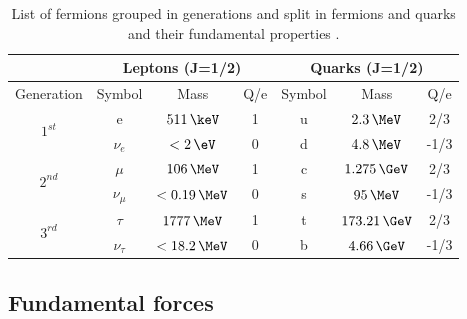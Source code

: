 \begin{table}[!htb]
\centering
\begin{tabular}{|c||c|c|c||c|c|c|}
\hline
 & \multicolumn{3}{c||}{Leptons (J=1/2)} & \multicolumn{3}{c|}{Quarks (J=1/2)} \\
\hline
Generation                &     Symbol &            Mass & Q/e & Symbol &           Mass & Q/e \\
\hline\hline
\multirow{2}{*}{$1^{st}$} & e          &     $511\,\keV$ &   1 &      u &    $2.3\,\MeV$ &  2/3 \\
                          & $\nu_e$    &     $< 2\, \eV$ &   0 &      d &    $4.8\,\MeV$ & -1/3 \\
\hline
\hline
\multirow{2}{*}{$2^{nd}$} & $\mu$      &  $   106\,\MeV$ &   1 &      c &  $1.275\,\GeV$ &  2/3 \\
                          & $\nu_\mu$  &  $< 0.19\,\MeV$ &   0 &      s &     $95\,\MeV$ & -1/3 \\
\hline
\hline
\multirow{2}{*}{$3^{rd}$} & $\tau$     & $   1777\,\MeV$ &   1 &      t & $173.21\,\GeV$ &  2/3 \\
                          & $\nu_\tau$ & $< 18.2 \,\MeV$ &   0 &      b &   $4.66\,\GeV$ & -1/3 \\
\hline
\end{tabular}
\caption[List of leptons and their fundamental properties]{List of fermions grouped in generations and split in fermions and quarks and their fundamental properties \cite{ARTICLE:PDG2014}.}
\label{TABLE:Theory_SM_ParticlesAndForces_MatterParticle}
\end{table}

\subsection{Fundamental forces}




